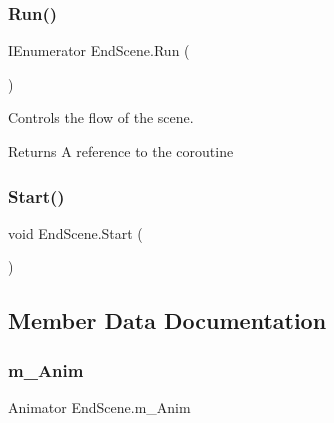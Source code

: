\subsubsection{\texorpdfstring{Run()}{Run()}}
{\footnotesize\ttfamily I\+Enumerator End\+Scene.\+Run (\begin{DoxyParamCaption}{ }\end{DoxyParamCaption})\hspace{0.3cm}{\ttfamily [private]}}



Controls the flow of the scene. 

\begin{DoxyReturn}{Returns}
A reference to the coroutine
\end{DoxyReturn}
\mbox{\label{class_end_scene_af546101a56df683a50f88f6809d4638a}} 
\subsubsection{\texorpdfstring{Start()}{Start()}}
{\footnotesize\ttfamily void End\+Scene.\+Start (\begin{DoxyParamCaption}{ }\end{DoxyParamCaption})\hspace{0.3cm}{\ttfamily [private]}}



\subsection{Member Data Documentation}
\mbox{\label{class_end_scene_a85e334f53cb4f5b9b44c499b5224cc62}} 
\subsubsection{\texorpdfstring{m\+\_\+\+Anim}{m\_Anim}}
{\footnotesize\ttfamily Animator End\+Scene.\+m\+\_\+\+Anim\hspace{0.3cm}{\ttfamily [private]}}

\mbox{\label{class_end_scene_a9b30c59b3252565d3b2bf3de29fe4403}} 

